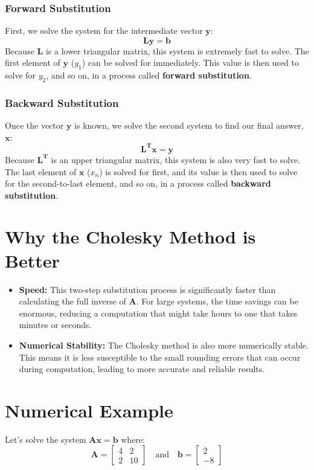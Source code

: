 \documentclass{article}
\begin{document}
\subsubsection{Forward Substitution}
First, we solve the system for the intermediate vector $\mathbf{y}$:
\[ \mathbf{Ly = b} \]
Because $\mathbf{L}$ is a lower triangular matrix, this system is extremely fast to solve. The first element of $\mathbf{y}$ ($y_1$) can be solved for immediately. This value is then used to solve for $y_2$, and so on, in a process called \textbf{forward substitution}.

\subsubsection{Backward Substitution}
Once the vector $\mathbf{y}$ is known, we solve the second system to find our final answer, $\mathbf{x}$:
\[ \mathbf{L^T x = y} \]
Because $\mathbf{L^T}$ is an upper triangular matrix, this system is also very fast to solve. The last element of $\mathbf{x}$ ($x_n$) is solved for first, and its value is then used to solve for the second-to-last element, and so on, in a process called \textbf{backward substitution}.

\section{Why the Cholesky Method is Better}

\begin{itemize}
    \item \textbf{Speed:} This two-step substitution process is significantly faster than calculating the full inverse of $\mathbf{A}$. For large systems, the time savings can be enormous, reducing a computation that might take hours to one that takes minutes or seconds.
    \item \textbf{Numerical Stability:} The Cholesky method is also more numerically stable. This means it is less susceptible to the small rounding errors that can occur during computation, leading to more accurate and reliable results.
\end{itemize}

\section{Numerical Example}

Let's solve the system $\mathbf{Ax = b}$ where:
\[ \mathbf{A} = \begin{bmatrix} 4 & 2 \\ 2 & 10 \end{bmatrix} \quad \text{and} \quad \mathbf{b} = \begin{bmatrix} 2 \\ -8 \end{bmatrix} \]
\end{document}
